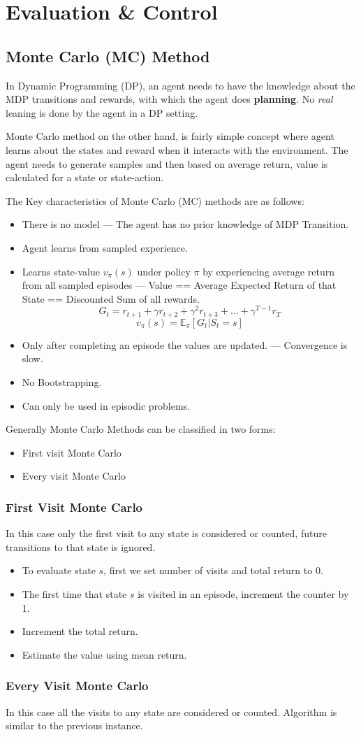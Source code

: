 \chapter{Evaluation \& Control}
%
\section{Monte Carlo (MC) Method}
%
In Dynamic Programming (DP), an agent needs to have the knowledge about the MDP transitions and rewards, with which the agent does \textbf{planning}.
No \textit{real} leaning is done by the agent in a DP setting.

Monte Carlo method on the other hand, is  fairly simple concept where agent learns about the states and reward when it interacts with the environment.
The agent needs to generate samples and then based on average return, value is calculated for a state or state-action.

The Key characteristics of Monte Carlo (MC) methods are as follows:
\begin{itemize}[leftmargin=*]
    \item There is no model --- The agent has no prior knowledge of MDP Transition.
    \item Agent learns from sampled experience.
    \item Learns state-value $v_\pi(s)$ under policy $\pi$ by experiencing average return from all sampled episodes --- Value == Average Expected Return of that State == Discounted Sum of all rewards.
    $$G_t = r_{t+1} + \gamma r_{t+2} + \gamma^2 r_{t+3} + \dots + \gamma^{T-1} r_{T}$$
    $$v_\pi (s) = \mathbb{E}_\pi [G_t | S_t = s]$$
    \item Only after completing an episode the values are updated. --- Convergence is slow.
    \item No Bootstrapping.
    \item Can only be used in episodic problems.
\end{itemize}

Generally Monte Carlo Methods can be classified in two forms:
\begin{itemize}
    \item First visit Monte Carlo
    \item Every visit Monte Carlo
\end{itemize}

\subsection{First Visit Monte Carlo}
In this case only the first visit to any state is considered or counted, future transitions to that state is ignored.
\begin{itemize}[leftmargin=*]
    \item To evaluate state $s$, first we set number of visits and total return to 0.
    \item The first time that state $s$ is visited in an episode, increment the counter by 1.
    \item Increment the total return.
    \item Estimate the value using mean return.
\end{itemize}

\subsection{Every Visit Monte Carlo}
In this case all the visits to any state are considered or counted.
Algorithm is similar to the previous instance.